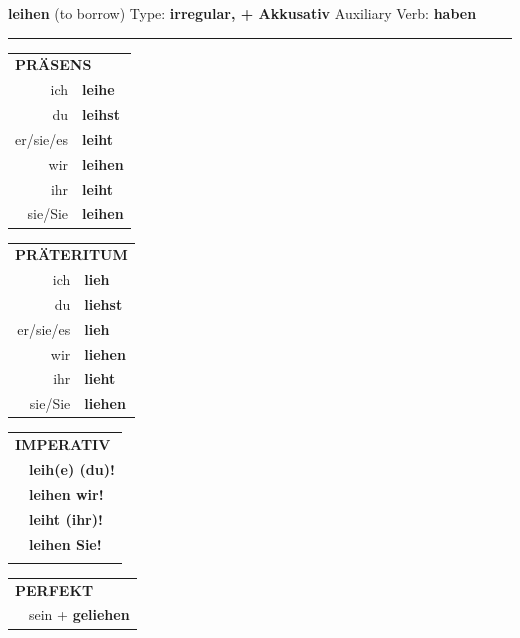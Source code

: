 \documentclass[10pt,a4paper]{revtex4-2}
\begin{document}
\begin{verbbox-acc}
    {\Large \bf leihen} (to borrow) \hfill Type: \textbf{irregular, + Akkusativ} \hfill Auxiliary Verb: \textbf{haben} 
    
     \vspace{5pt}

    \hrule
    
    \vspace{5pt}

  \begin{tabular}{rl}
     \multicolumn{2}{l}{\textbf{PRÄSENS} }\\
    ich & \textbf{leihe}\\
    du & \textbf{leihst}\\
    er/sie/es & \textbf{leiht}\\
    wir & \textbf{leihen}\\
    ihr & \textbf{leiht}\\
    sie/Sie & \textbf{leihen}\\
  \end{tabular}
  \hfill
     \begin{tabular}{rl}
    \multicolumn{2}{l}{\textbf{PRÄTERITUM} }\\
    ich & \textbf{lieh}\\
    du & \textbf{liehst}\\
    er/sie/es & \textbf{lieh}\\
    wir & \textbf{liehen}\\
    ihr & \textbf{lieht}\\
    sie/Sie & \textbf{liehen}\\
  \end{tabular}
  \hfill
  \begin{tabular}{rl}
     \multicolumn{2}{l}{\textbf{IMPERATIV} }\\
   & \textbf{leih(e) (du)!}\\
   & \textbf{leihen wir!}\\
   & \textbf{leiht (ihr)!}\\
   & \textbf{leihen Sie!}\\
   & \vspace{10pt}
  \end{tabular}

    \vspace{10pt}

 \begin{tabular}{rl}
     \multicolumn{2}{l}{\textbf{PERFEKT}}\\
   & sein + \textbf{geliehen}\\
  \end{tabular}
\hfill
   \begin{tabular}{rl}
   

\end{tabular}
\end{verbbox-acc}
\end{document}
